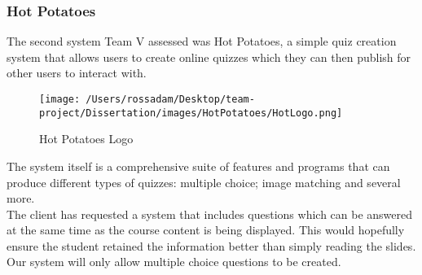 \documentclass{l3proj}
\begin{document}
\subsubsection{Hot Potatoes}

The second system Team V assessed was Hot Potatoes, a simple quiz
creation system that allows users to create online quizzes which they
can then publish for other users to interact with.\\ 

\begin{figure}[!htb]
\caption{Hot Potatoes Logo}
 \centering
\texttt{[image: /Users/rossadam/Desktop/team-project/Dissertation/images/HotPotatoes/HotLogo.png]}
\end{figure}

The system itself is a comprehensive suite of features and programs
that can produce different types of quizzes: multiple choice; image
matching and several more.\\

The client has requested a system that includes questions which can be
answered at the same time as the course content is being
displayed. This would hopefully ensure the student retained the
information better than simply reading the slides. Our system will
only allow multiple choice questions to be created.
\end{document}
